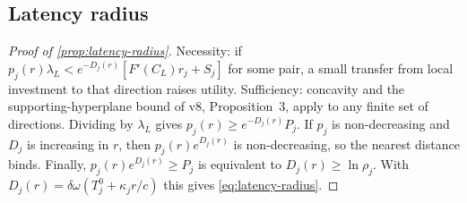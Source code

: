 \documentclass[11pt,a4paper]{article}
\theoremstyle{definition}
\begin{document}
\subsection{Latency radius}
\label{app:latency-proof}
\begin{proof}[Proof of \cref{prop:latency-radius}]
Necessity: if $p_j(r)\lambda_L<e^{-D_j(r)}[F'(C_L)r_j+S_j]$ for some pair, a
small transfer from local investment to that direction raises utility.
Sufficiency: concavity and the supporting-hyperplane bound of v8,
Proposition~3, apply to any finite set of directions. Dividing by $\lambda_L$
gives $p_j(r)\geq e^{-D_j(r)}P_j$. If $p_j$ is non-decreasing and $D_j$ is
increasing in $r$, then $p_j(r)e^{D_j(r)}$ is non-decreasing, so the nearest
distance binds. Finally, $p_j(r)e^{D_j(r)}\geq P_j$ is equivalent to
$D_j(r)\geq\ln\rho_j$. With $D_j(r)=\delta\omega(T_j^0+\kappa_jr/c)$ this gives
\cref{eq:latency-radius}.
\end{proof}
\end{document}
